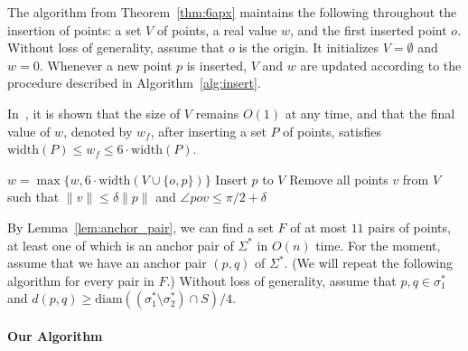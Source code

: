 \documentclass[english,a4paper, cleveref, autoref, thm-restate, nolineno]{socg-lipics-v2021}
\theoremstyle{star}
\theoremstyle{claimstar}
\newcommand{\diam}{\ensuremath{\mathrm{diam}}}
\newcommand{\width}{\ensuremath{\mathrm{width}}}
\begin{document}
\sixapx*




The algorithm from Theorem~\ref{thm:6apx} maintains the following throughout the insertion of points: a set $V$ of points, a real value $w$, and the first inserted point $o$.
Without loss of generality, assume that $o$ is the origin.
It initializes $V = \emptyset$ and $w = 0$.
Whenever a new point $p$ is inserted, $V$ and $w$ are updated according to the procedure described in Algorithm~\ref{alg:insert}.

In~\cite{chan2006faster}, it is shown that the size of $V$ remains $O(1)$ at any time, and that the final value of $w$, denoted by $w_f$, after inserting a set $P$ of points, satisfies $\width(P) \le w_f \le 6 \cdot \width(P)$.


\begin{algorithm}
\caption{Processing a new point $p$ (See the proof of Theorem A.3 in \cite{chan2006faster}. Let $\delta>0$ be a sufficiently small constant.)}
\label{alg:insert}
\begin{algorithmic}[1]
\State $w = \max \{w, 6\cdot \width(V \cup \{ o, p\} ) \}$ 
    \State Insert $p$ to $V$
    \State Remove all points $v$ from $V$ such that $\|v\| \le \delta \|p\|$ and $\angle pov \le \pi/2 + \delta$
\EndIf
\EndFunction
\end{algorithmic}
\end{algorithm}


\medbreak
By Lemma~\ref{lem:anchor_pair}, we can find a set $F$ of at most $11$ pairs of points, at least one of which is an anchor pair of $\Sigma^*$ in $O(n)$ time. 
For the moment, assume that we have an anchor pair $(p, q)$ of $\Sigma^*$. (We will repeat the following algorithm for every pair in $F$.)
Without loss of generality, assume that $p, q \in \sigma_1^*$ and $d(p, q) \ge \diam((\sigma_1^*\setminus \sigma_2^* ) \cap S)/4$. 







\paragraph*{Our Algorithm}




\end{document}

